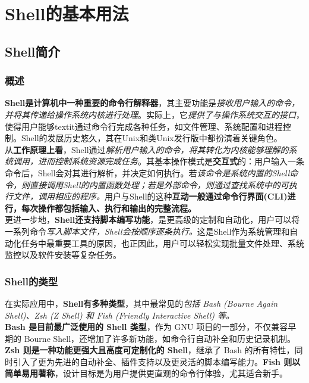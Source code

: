 \chapter{Shell的基本用法}
\label{cp:shellusage}

\section{Shell简介}

\subsection{概述}

\textbf{Shell是计算机中一种重要的命令行解释器}，其主要功能是\textit{接收用户输入的命令，并将其传递给操作系统内核进行处理}。实际上，它\textit{提供了与操作系统交互的接口}，使得用户能够textit{通过命令行完成各种任务}，如文件管理、系统配置和进程控制。Shell的发展历史悠久，其在Unix和类Unix发行版中都扮演着关键角色。\\

从\textbf{工作原理上看}，Shell通过\textit{解析用户输入的命令，将其转化为内核能够理解的系统调用，进而控制系统资源完成任务}。其基本操作模式是\textbf{交互式}的：用户输入一条命令后，Shell会对其进行解析，并决定如何执行。若\textit{该命令是系统内置的Shell命令，则直接调用Shell的内置函数处理；若是外部命令，则通过查找系统中的可执行文件，调用相应的程序。}用户与Shell的这种\textbf{互动一般通过命令行界面(CLI)进行，每次操作都包括输入、执行和输出的完整流程。}\\

更进一步地，\textbf{Shell还支持脚本编写功能}，是更高级的定制和自动化，用户可以将一系列命令\textit{写入脚本文件，Shell会按顺序逐条执行。}这是Shell作为系统管理和自动化任务中最重要工具的原因，也正因此，用户可以轻松实现批量文件处理、系统监控以及软件安装等复杂任务。

\subsection{Shell的类型}

在实际应用中，\textbf{Shell有多种类型}，其中最常见的\textit{包括 Bash (Bourne Again Shell)、Zsh (Z Shell) 和 Fish (Friendly Interactive Shell) 等。}\\

\textbf{Bash 是目前最广泛使用的 Shell 类型}，作为 GNU 项目的一部分，不仅兼容早期的 Bourne Shell，还增加了许多新功能，如命令行自动补全和历史记录机制。\textbf{Zsh 则是一种功能更强大且高度可定制化的 Shell}，继承了 Bash 的所有特性，同时引入了更为先进的自动补全、插件支持以及更灵活的脚本编写能力。\textbf{Fish 则以简单易用著称}，设计目标是为用户提供更直观的命令行体验，尤其适合新手。\\

